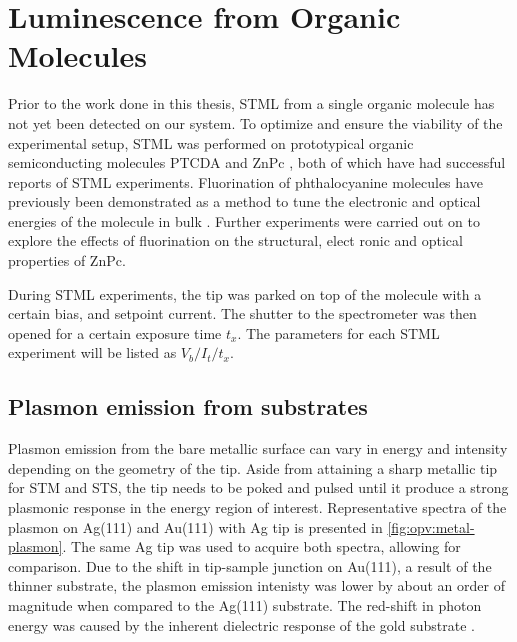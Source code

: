 
\chapter{Luminescence from Organic Molecules}
\label{ch:opv}

Prior to the work done in this thesis, \ac{STML} from a single organic molecule has not yet been detected on our system. To optimize and ensure the viability of the experimental setup, \ac{STML} was performed on prototypical organic semiconducting molecules \ac{PTCDA} \citep{Rzeznicka2011, Kimura2019} and \ac{ZnPc} \citep{Zhang2016, Doppagne2017, Zhang2017, Imada2016, Doppagne2018, Miwa2019}, both of which have had successful reports of \ac{STML} experiments. Fluorination of phthalocyanine molecules have previously been demonstrated as a method to tune the electronic and optical energies of the molecule in bulk \citep{schwarze2016band, warren2019controlling}. Further experiments were carried out on  to explore the effects of fluorination on the structural, elect ronic and optical properties of ZnPc.

During \ac{STML} experiments, the tip was parked on top of the molecule with a certain bias, and setpoint current. The shutter to the spectrometer was then opened for a certain exposure time $t_x$. The parameters for each \ac{STML} experiment will be listed as $V_b/I_t/t_x$.


\section{Plasmon emission from substrates}

Plasmon emission from the bare metallic surface can vary in energy and intensity depending on the geometry of the tip. Aside from attaining a sharp metallic tip for \ac{STM} and \ac{STS}, the tip needs to be poked and pulsed until it produce a strong plasmonic response in the energy region of interest. Representative spectra of the plasmon on Ag(111) and Au(111) with Ag tip is presented in \autoref{fig:opv:metal-plasmon}. The same Ag tip was used to acquire both spectra, allowing for comparison. Due to the shift in tip-sample junction on Au(111), a result of the thinner substrate, the plasmon emission intenisty was lower by about an order of magnitude when compared to the Ag(111) substrate. The red-shift in photon energy was caused by the inherent dielectric response of the gold substrate \citep{olmon2012optical, yang2015optical}. 


